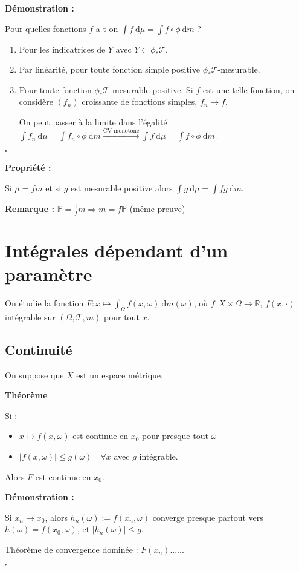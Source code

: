 \documentclass[10pt,a4paper,notitlepage ]{report}
\newcommand{\R}{\mathbb R}
\newcommand{\T}{\mathcal T}
\newcommand{\dd}{\ \mathrm d}
\newcommand{\1}{\mathds 1}
\newcommand{\prob}{\mathbb P}
\newcounter{th}
\newenvironment{theorem}[1][]{
\refstepcounter{th}
\begin{tcolorbox}
	\textbf{Théorème \theth \ #1}
	
	
}{\end{tcolorbox}}
\newenvironment{propriete}[1][]{
	\begin{tcolorbox}
		\textbf{Propriété #1 : }
}
{\end{tcolorbox}}
\newenvironment{demo}[1][]{

	\textbf{Démonstration #1 :}
}{\begin{flushright}
	$\square$
\end{flushright}
}
\newenvironment{rem}{
	
		\textbf{Remarque :}}{}
\begin{document}
\begin{demo}
	Pour quelles fonctions $f$ a-t-on $\int f\dd \mu = \int f \circ \phi \dd m$ ?
	\begin{enumerate}
		\item Pour les indicatrices de $Y$ avec $Y \subset \phi_*\T$.
		\item Par linéarité, pour toute fonction simple positive $\phi_*\T$-mesurable.
		\item Pour toute fonction $\phi_*\T$-mesurable positive. Si $f$ est une telle fonction, on considère $(f_n)$ croissante de fonctions simples, $f_n \rightarrow f$.
		
		On peut passer à la limite dans l'égalité $\int f_n \dd \mu = \int f_n \circ \phi \dd m \overset{\text{CV monotone}} \longrightarrow \int f \dd\mu = \int f\circ \phi \dd m$.
	\end{enumerate}
\end{demo}

\begin{propriete}
	Si $\mu = fm$ et si $g$ est mesurable positive alors $\int g \dd \mu = \int fg \dd m$.
\end{propriete}

\begin{rem}
	$\prob = \frac 1 f m \Rightarrow m=f\prob$ (même preuve)
\end{rem}

\section{Intégrales dépendant d'un paramètre}

On étudie la fonction $F : x \mapsto \int_\Omega f(x,\omega) \dd m(\omega)$, où $f:X\times \Omega \rightarrow \R$, $f(x, \cdot)$ intégrable sur $(\Omega,\T,m)$ pour tout $x$.

\subsection{Continuité}
On suppose que $X$ est un espace métrique.
\begin{theorem}
	Si : \begin{itemize}
		\item $x\mapsto f(x,\omega)$ est continue en $x_0$ pour presque tout $\omega$
		\item $|f(x,\omega)| \le g(\omega) \quad \forall x$ avec $g$ intégrable.
	\end{itemize}
	Alors $F$ est continue en $x_0$.
\end{theorem}
\begin{demo}
	Si $x_n \rightarrow x_0$, alors $h_n(\omega) := f(x_n,\omega)$ converge presque partout vers $h(\omega)=f(x_0,\omega)$, et $|h_n(\omega)| \le g$.
	
	Théorème de convergence dominée : $F(x_n) ......$
\end{demo}
\end{document}
